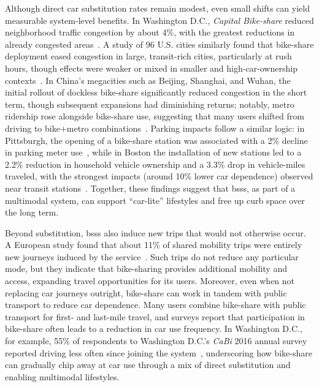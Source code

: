     Although direct car substitution rates remain modest, even small shifts can yield measurable system-level benefits. In Washington D.C., \textit{Capital Bike-share} reduced neighborhood traffic congestion by about 4\%, with the greatest reductions in already congested areas~\cite{Hamilton2018}. A study of 96 U.S. cities similarly found that bike-share deployment eased congestion in large, transit-rich cities, particularly at rush hours, though effects were weaker or mixed in smaller and high-car-ownership contexts~\cite{Wang2017}. In China’s megacities such as Beijing, Shanghai, and Wuhan, the initial rollout of dockless bike-share significantly reduced congestion in the short term, though subsequent expansions had diminishing returns; notably, metro ridership rose alongside bike-share use, suggesting that many users shifted from driving to bike+metro combinations~\cite{Xu2024}. Parking impacts follow a similar logic: in Pittsburgh, the opening of a bike-share station was associated with a 2\% decline in parking meter use~\cite{Pelechrinis2016}, while in Boston the installation of new stations led to a 2.2\% reduction in household vehicle ownership and a 3.3\% drop in vehicle-miles traveled, with the strongest impacts (around 10\% lower car dependence) observed near transit stations~\cite{Basu2021}. Together, these findings suggest that \acp{bss}, as part of a multimodal system, can support “car-lite” lifestyles and free up curb space over the long term.  

    Beyond substitution, \acp{bss} also induce new trips that would not otherwise occur. A European study found that about 11\% of shared mobility trips were entirely new journeys induced by the service~\cite{Bosehans2024}. Such trips do not reduce any particular mode, but they indicate that bike-sharing provides additional mobility and access, expanding travel opportunities for its users. Moreover, even when not replacing car journeys outright, bike-share can work in tandem with public transport to reduce car dependence. Many users combine bike-share with public transport for first- and last-mile travel, and surveys report that participation in bike-share often leads to a reduction in car use frequency. In Washington D.C., for example, 55\% of respondents to Washington D.C.'s \textit{CaBi} 2016 annual survey reported driving less often since joining the system~\cite{NACTO2020}, underscoring how bike-share can gradually chip away at car use through a mix of direct substitution and enabling multimodal lifestyles.

